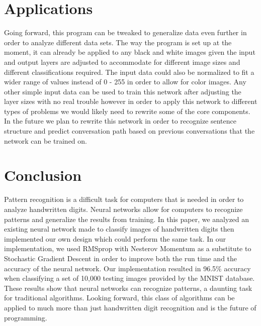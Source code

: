 \documentclass[12pt]{article}
\theoremstyle{definition}
\theoremstyle{plain}
\begin{document}
\section{Applications}
Going forward, this program can be tweaked to generalize data even further in order to analyze different data sets. The way the program is set up at the moment, it can already be applied to any black and white images given the input and output layers are adjusted to accommodate for different image sizes and different classifications required. The input data could also be normalized to fit a wider range of values instead of 0 \-- 255 in order to allow for color images. Any other simple input data can be used to train this network after adjusting the layer sizes with no real trouble however in order to apply this network to different types of problems we would likely need to rewrite some of the core components. In the future we plan to rewrite this network in order to recognize sentence structure and predict conversation path based on previous conversations that the network can be trained on.

\section{Conclusion}
Pattern recognition is a difficult task for computers that is needed in order to analyze handwritten digits. Neural networks allow for computers to recognize patterns and generalize the results from training. In this paper, we analyzed an existing neural network made to classify images of handwritten digits then implemented our own design which could perform the same task. In our implementation, we used RMSprop with Nesterov Momentum\cite{readthedocs,ruder_2016} as a substitute to Stochastic Gradient Descent in order to improve both the run time and the accuracy of the neural network. Our implementation resulted in 96.5\% accuracy when classifying a set of 10,000 testing images provided by the MNIST database. These results show that neural networks can recognize patterns, a daunting task for traditional algorithms. Looking forward, this class of algorithms can be applied to much more than just handwritten digit recognition and is the future of programming.

\nocite{*}
\printbibliography
\end{document}
